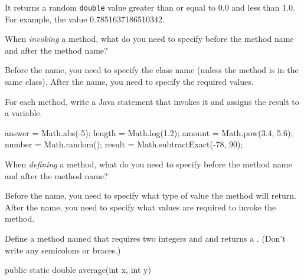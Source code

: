 \begin{answer}
It returns a random \texttt{double} value greater than or equal to 0.0 and less than 1.0.
For example, the value 0.7851637186510342.
\end{answer}


\Q When \emph{invoking} a method, what do you need to specify before the method name and after the method name?

\begin{answer}
Before the name, you need to specify the class name (unless the method is in the same class).
After the name, you need to specify the required values.
\end{answer}


\Q For each method, write a Java statement that invokes it and assigns the result to a variable.

\begin{answer}[8em]
\vspace{-1ex}
\begin{javaans}
answer = Math.abs(-5);
length = Math.log(1.2);
amount = Math.pow(3.4, 5.6);
number = Math.random();
result = Math.subtractExact(-78, 90);
\end{javaans}
\end{answer}


\Q When \emph{defining} a method, what do you need to specify before the method name and after the method name?

\begin{answer}
Before the name, you need to specify what type of value the method will return.
After the name, you need to specify what values are required to invoke the method.
\end{answer}


\Q Define a method named  that requires two integers  and  and returns a . (Don't write any semicolons or braces.)

\begin{answer}
\begin{javaans}
public static double average(int x, int y)
\end{javaans}
\end{answer}




